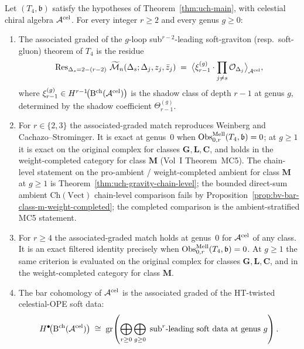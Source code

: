 \begin{theorem}
\label{thm:uch-soft-hierarchy}
Let $(T_4,\mathfrak b)$ satisfy the hypotheses of
Theorem~\ref{thm:uch-main}, with celestial chiral algebra
$\mathcal A^{\mathrm{cel}}$. For every integer $r \geq 2$ and every genus
$g \geq 0$:
\begin{enumerate}[label=\textup{(\roman*)}]
\item The associated graded of the $g$-loop sub${}^{r-2}$-leading
soft-graviton (resp.\ soft-gluon) theorem of $T_4$ is the residue
\[
\operatorname{Res}_{\Delta_s = 2 - (r-2)}\,
\widetilde{\mathcal M}_n(\Delta_s; \Delta_j, z_j, \bar z_j)
\;=\;
\bigl\langle \xi_{r-1}^{(g)}\cdot
\prod_{j \neq s} \mathcal O_{\Delta_j}
\bigr\rangle_{\mathcal A^{\mathrm{cel}}},
\]
where $\xi_{r-1}^{(g)} \in H^{r-1}\!\bigl(\mathrm B^{\mathrm{ch}}(\mathcal A^{\mathrm{cel}})\bigr)$
is the shadow class of depth $r-1$ at genus $g$, determined by the
shadow coefficient $\Theta_{r-1}^{(g)}$.

\item For $r \in \{2, 3\}$ the associated-graded match reproduces
Weinberg and Cachazo--Strominger. It is exact at genus~$0$ when
$\operatorname{Obs}^{\mathrm{Mell}}_{0,r}(T_4,\mathfrak b)=0$; at $g \geq 1$ it is
exact on the original complex for classes
$\mathbf G, \mathbf L, \mathbf C$, and holds in the weight-completed
category for class $\mathbf M$ (Vol~I Theorem~MC5). The chain-level
statement on the pro-ambient / weight-completed ambient for class
$\mathbf M$ at $g \geq 1$ is
Theorem~\ref{thm:uch-gravity-chain-level}; the bounded direct-sum ambient
$\mathrm{Ch}(\mathrm{Vect})$ chain-level comparison fails by
Proposition~\ref{prop:bv-bar-class-m-weight-completed}; the completed
comparison is the ambient-stratified MC5 statement.

\item For $r \geq 4$ the associated-graded match holds at genus~$0$
for $\mathcal A^{\mathrm{cel}}$ of any class. It is an exact filtered
identity precisely when
$\operatorname{Obs}^{\mathrm{Mell}}_{0,r}(T_4,\mathfrak b)=0$. At $g \geq 1$ the
same criterion is evaluated on the original complex for classes
$\mathbf G, \mathbf L, \mathbf C$, and in the weight-completed
category for class $\mathbf M$.

\item The bar cohomology of $\mathcal A^{\mathrm{cel}}$ is the associated
graded of the HT-twisted celestial-OPE soft data:
\[
H^\bullet\!\bigl(\mathrm B^{\mathrm{ch}}(\mathcal A^{\mathrm{cel}})\bigr)
\;\cong\;
\operatorname{gr}\!\left(
\bigoplus_{r \geq 0} \bigoplus_{g \geq 0}
\;\text{sub}^r\text{-leading soft data at genus } g
\right).
\]
\end{enumerate}
\end{theorem}

